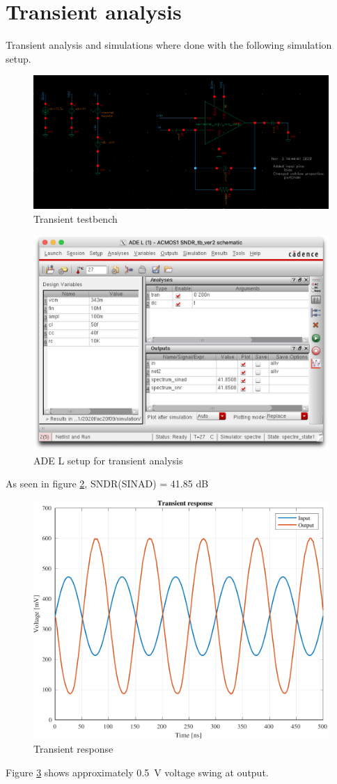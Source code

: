 \section{Transient analysis}
Transient analysis and simulations where done with the following simulation setup.
\begin{figure}[h!]
    \centering
    \includegraphics[width=.9\linewidth]{Images/Virtuoso/tran_tb.png}
    \caption{Transient testbench}
    \label{fig:trans:tb}
\end{figure}

\begin{figure}[h!]
    \centering
    \includegraphics[width=.9\linewidth]{Images/Virtuoso/Transient_stimuli.png}
    \caption{ADE L setup for transient analysis}
    \label{fig:ADE:tran}
\end{figure}
As seen in figure \ref{fig:ADE:tran}, SNDR(SINAD) = 41.85 dB

\newpage
\null
\vfill
\begin{figure}[H]
    \centering
    \includegraphics[width=.9\linewidth]{Images/Simulations/tran_response.pdf}
    \caption{Transient response}
    \label{fig:tran:sim}
\end{figure}
Figure \ref{fig:tran:sim} shows approximately \SI{0.5}{\volt} voltage swing at output. 
\vfill